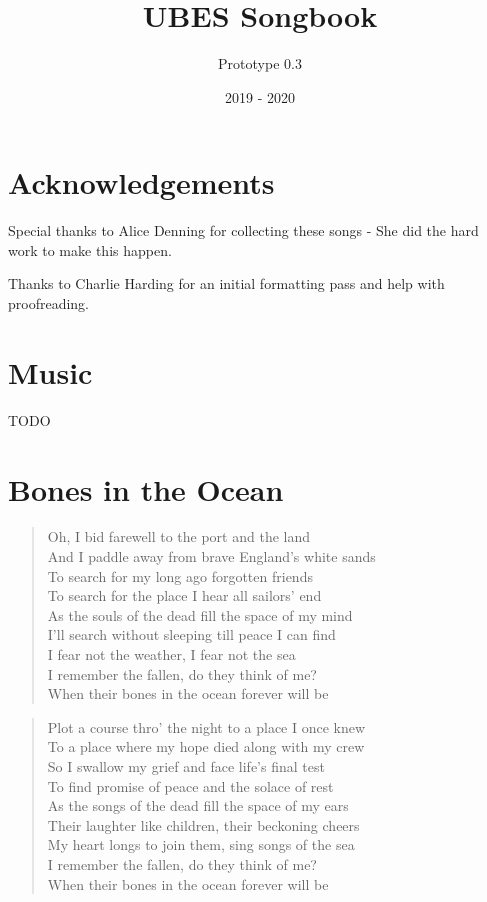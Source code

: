 \documentclass[8pt,twoside]{extarticle}
\title{UBES Songbook}
\author{Prototype 0.3}
\date{2019 - 2020}
\newenvironment{xverse}{
	\interlinepenalty 10000
	\begin{verse}
	\begin{minipage}{\linewidth}
	\parskip 5pt
	\vspace{-6pt}
	}
	{
	\end{minipage}
	\end{verse}
	\penalty 0
	\vspace{-6pt}
	}
\begin{document}

\maketitle
\newpage

\section*{Acknowledgements}
\center
Special thanks to Alice Denning for collecting these songs - She did the hard
work to make this happen.

Thanks to Charlie Harding for an initial formatting pass and help with
proofreading.
\newpage

\tableofcontents

\section{Music}
TODO


\section{Bones in the Ocean}

\begin{xverse}
Oh, I bid farewell to the port and the land \\
And I paddle away from brave England’s white sands \\
To search for my long ago forgotten friends \\
To search for the place I hear all sailors’ end \\
As the souls of the dead fill the space of my mind \\
I’ll search without sleeping till peace I can find \\
I fear not the weather, I fear not the sea \\
I remember the fallen, do they think of me? \\
When their bones in the ocean forever will be \\
\end{xverse}

\begin{xverse}
Plot a course thro’ the night to a place I once knew \\
To a place where my hope died along with my crew \\
So I swallow my grief and face life’s final test \\
To find promise of peace and the solace of rest \\
As the songs of the dead fill the space of my ears \\
Their laughter like children, their beckoning cheers \\
My heart longs to join them, sing songs of the sea \\
I remember the fallen, do they think of me? \\
When their bones in the ocean forever will be \\
\end{xverse}
\end{document}
